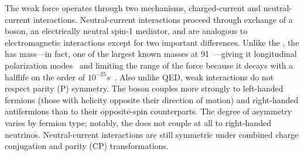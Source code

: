 The weak force operates through two mechanisms, charged-current and neutral-current interactions.
Neutral-current interactions proceed through exchange of a {\PZ} boson, an electrically neutral spin-1 mediator, and are analogous to electromagnetic interactions except for two important differences.
Unlike the {\Pa}, the {\PZ} has mass---in fact, one of the largest known masses at 91\GeV~\cite{Olive:2016xmw}---giving it longitudinal polarization modes~\cite{Halzen:1984mc} and limiting the range of the force because it decays with a halflife on the order of $10^{-25}\unit{s}$~\cite{Olive:2016xmw}.
Also unlike QED, weak interactions do not respect parity (P) symmetry.
The {\PZ} boson couples more strongly to left-handed fermions (those with helicity opposite their direction of motion) and right-handed antifermions than to their opposite-spin counterparts.
The degree of asymmetry varies by fermion type; notably, the {\PZ} does not couple at all to right-handed neutrinos.
Neutral-current interactions are still symmetric under combined charge conjugation and parity (CP) transformations.

